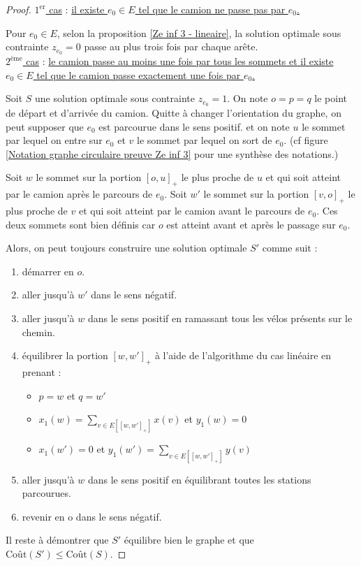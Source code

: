 \begin{proof}\uline{$1^{\mbox{er}}$ cas} : \uline{il existe $e_0 \in E$ tel que le camion ne passe pas par $e_0$.}

Pour $e_0 \in E$, selon la proposition \ref{Ze inf 3 - lineaire}, la solution optimale sous contrainte $z_{e_0}=0$ passe au plus trois fois par chaque arête.
\\

\uline{$2^{\mbox{ème}}$ cas} : \uline{le camion passe au moins une fois par tous les sommets et il existe $e_0 \in E$ tel que le camion passe exactement une fois par $e_0$.}

Soit $S$ une solution optimale sous contrainte $z_{e_0} = 1$. On note $o=p=q$ le point de départ et d'arrivée du camion. Quitte à changer l'orientation du graphe, on peut supposer que $e_0$ est parcourue dans le sens positif. et on note $u$ le sommet par lequel on entre sur $e_0$ et $v$ le sommet par lequel on sort de $e_0$. (cf figure \ref{Notation graphe circulaire preuve Ze inf 3} pour une synthèse des notations.)

Soit $w$ le sommet sur la portion $[o,u]_+$ le plus proche de $u$ et qui soit atteint par le camion après le parcours de $e_0$. Soit $w'$ le sommet sur la portion $[v,o]_+$ le plus proche de $v$ et qui soit atteint par le camion avant le parcours de $e_0$. Ces deux sommets sont bien définis car $o$ est atteint avant et après le passage sur $e_0$.

Alors, on peut toujours construire une solution optimale $S'$ comme suit :
\begin{enumerate}
\item\label{NewS1} démarrer en $o$.
\item\label{NewS2} aller jusqu'à $w'$ dans le sens négatif.
\item\label{NewS3} aller jusqu'à $w$ dans le sens positif en ramassant tous les vélos présents sur le chemin.
\item\label{NewS4} équilibrer la portion $[w,w']_+$ à l'aide de l'algorithme du cas linéaire en prenant :
  \begin{itemize}
  \item $p=w$ et $q=w'$
  \item $\displaystyle x_1(w) = \sum_{v \in E\left[ \left[w,w'\right]_+ \right]} x(v)$ et $y_1(w) = 0$
  \item $x_1(w') = 0$ et $\displaystyle y_1(w') = \sum_{v \in E\left[ \left[w,w'\right]_+ \right]} y(v)$
  \end{itemize}
\item\label{NewS5} aller jusqu'à $w$ dans le sens positif en équilibrant toutes les stations parcourues.
\item\label{NewS6} revenir en o dans le sens négatif.
\end{enumerate}
Il reste à démontrer que $S'$ équilibre bien le graphe et que $\mbox{Coût}(S') \le \mbox{Coût}(S)$.


\end{proof}
